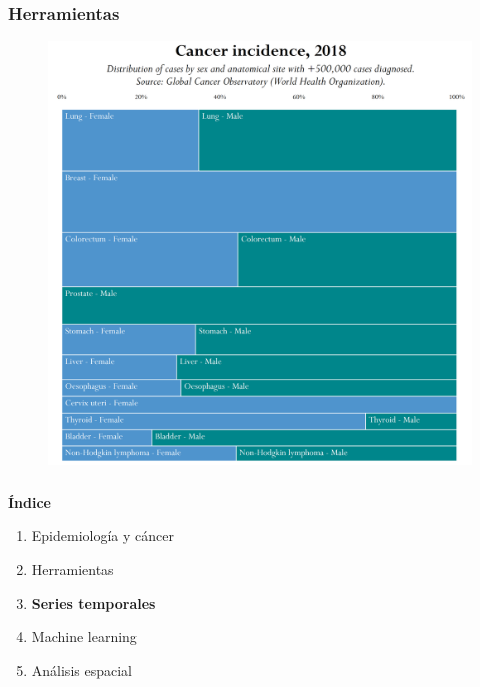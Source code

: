 \documentclass{beamer}
\begin{document}
\begin{frame}\frametitle{Herramientas}
	
	\vspace{-5pt}
	\begin{figure}
		\centering
		\includegraphics[width=.68\textwidth]{images/26.png}
	\end{figure}
	
\end{frame}


\begin{frame}\frametitle{}
	
	\Large{\textbf{Índice}}\\[2ex]
	\normalsize
	\begin{enumerate}
		\item Epidemiología y cáncer\\[2ex]
		\item Herramientas\\[2ex]
		\item \textbf{Series temporales} \\[2ex]
		\item Machine learning  \\[2ex]
		\item Análisis espacial \\[2ex]
	\end{enumerate}
	
\end{frame}
\end{document}

